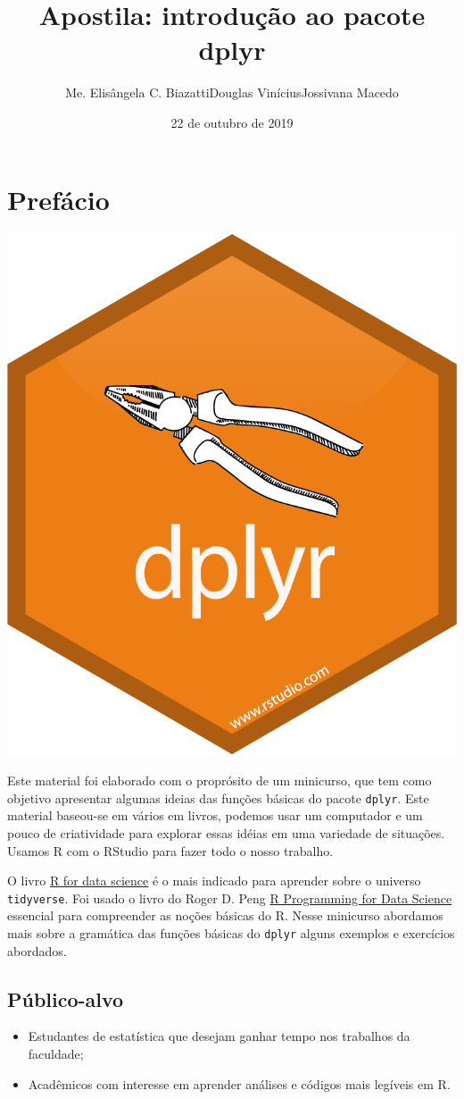 \documentclass[]{book}
\title{Apostila: introdução ao pacote dplyr}
\author{Me. Elisângela C. BiazattiDouglas ViníciusJossivana Macedo}
\date{22 de outubro de 2019}
\providecommand{\tightlist}{%
  \setlength{\itemsep}{0pt}\setlength{\parskip}{0pt}}
\begin{document}
\maketitle

{
\setcounter{tocdepth}{1}
\tableofcontents
}
\hypertarget{prefuxe1cio}{%
\chapter{Prefácio}\label{prefuxe1cio}}

\begin{center}\includegraphics[width=0.3\linewidth]{imagens/dplyr} \end{center}

Este material foi elaborado com o proprósito de um minicurso, que tem como objetivo apresentar algumas ideias das funções básicas do pacote \texttt{dplyr}. Este material baseou-se em vários em livros, podemos usar um computador e um pouco de criatividade para explorar essas idéias em uma variedade de situações. Usamos R com o RStudio para fazer todo o nosso trabalho.

O livro \href{https://r4ds.had.co.nz/}{R for data science} é o mais indicado para aprender sobre o universo \texttt{tidyverse}. Foi usado o livro do Roger D. Peng \href{https://bookdown.org/rdpeng/rprogdatascience/}{R Programming for Data Science} essencial para compreender as noções básicas do R. Nesse minicurso abordamos mais sobre a gramática das funções básicas do \texttt{dplyr} alguns exemplos e exercícios abordados.

\hypertarget{puxfablico-alvo}{%
\section{Público-alvo}\label{puxfablico-alvo}}

\begin{itemize}
\tightlist
\item
  Estudantes de estatística que desejam ganhar tempo nos trabalhos da faculdade;
\item
  Acadêmicos com interesse em aprender análises e códigos mais legíveis em R.
\end{itemize}
\end{document}
